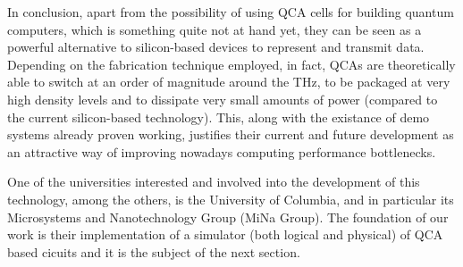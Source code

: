 In conclusion, apart from the possibility of using QCA cells for building quantum computers, which is something quite not at hand yet, they can be seen as a powerful alternative to silicon-based devices to represent and transmit data. Depending on the fabrication technique employed, in fact, QCAs are theoretically able to switch at an order of magnitude around the THz, to be packaged at very high density levels and to dissipate very small amounts of power (compared to the current silicon-based technology). This, along with the existance of demo systems already proven working, justifies their current and future development as an attractive way of improving nowadays computing performance bottlenecks.

One of the universities interested and involved into the development of this technology, among the others, is the University of Columbia, and in particular its Microsystems and Nanotechnology Group (MiNa Group). The foundation of our work is their implementation of a simulator (both logical and physical) of QCA based cicuits and it is the subject of the next section.

